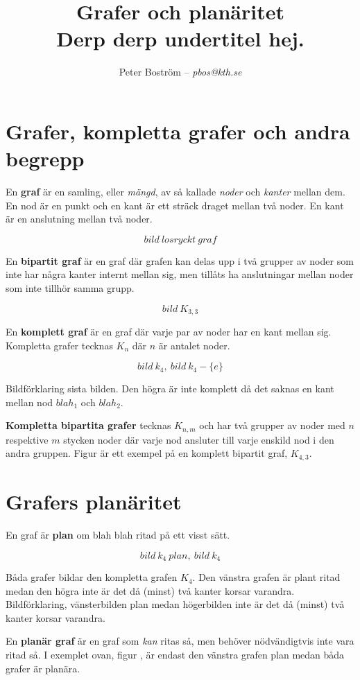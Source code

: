 \documentclass[a4paper,11pt]{article}
\title{Grafer och planäritet\\\vspace{4pt}\normalsize Derp derp undertitel hej.}
\author{Peter Boström -- \emph{pbos@kth.se}}
\begin{document}
\maketitle
\pagestyle{fancyplain}

\section*{Grafer, kompletta grafer och andra begrepp}

En \textbf{graf} är en samling, eller \emph{mängd}, av så kallade \emph{noder} och \emph{kanter} mellan dem. En nod är en punkt och en kant är ett sträck draget mellan två noder. En kant är en anslutning mellan två noder.

$$bild\ losryckt\ graf$$

En \textbf{bipartit graf} är en graf där grafen kan delas upp i två grupper av noder som inte har några kanter internt mellan sig, men tillåts ha anslutningar mellan noder som inte tillhör samma grupp.

$$bild\ K_{3,3}$$

En \textbf{komplett graf} är en graf där varje par av noder har en kant mellan sig. Kompletta grafer tecknas $K_n$ där $n$ är antalet noder.

$$bild\ k_4,\ bild\ k_4-\{e\}$$

Bildförklaring sista bilden. Den högra är inte komplett då det saknas en kant mellan nod $blah_1$ och $blah_2$.

\textbf{Kompletta bipartita grafer} tecknas $K_{n,m}$ och har två grupper av noder med $n$ respektive $m$ stycken noder där varje nod ansluter till varje enskild nod i den andra gruppen. Figur \cite{somefig} är ett exempel på en komplett bipartit graf, $K_{4,3}$.

\section*{Grafers planäritet}

En graf är \textbf{plan} om blah blah ritad på ett visst sätt.

$$bild\ k_4\ plan,\ bild\ k_4$$

Båda grafer bildar den kompletta grafen $K_4$. Den vänstra grafen är plant ritad medan den högra inte är det då (minst) två kanter korsar varandra.
Bildförklaring, vänsterbilden plan medan högerbilden inte är det då (minst) två kanter korsar varandra.

En \textbf{planär graf} är en graf som \emph{kan} ritas så, men behöver nödvändigtvis inte vara ritad så. I exemplet ovan, figur \cite{somefig}, är endast den vänstra grafen plan medan båda grafer är planära.
\end{document}
